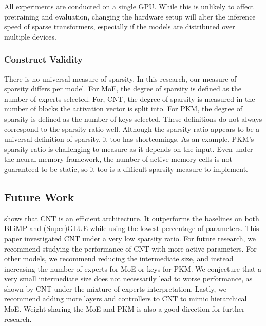 All experiments are conducted on a single GPU. While this is unlikely to affect pretraining and evaluation, changing the hardware setup will alter the inference speed of sparse transformers, especially if the models are distributed over multiple devices.
\subsubsection{Construct Validity}
There is no universal measure of sparsity. In this research, our measure of sparsity differs per model. For MoE, the degree of sparsity is defined as the number of experts selected. For, CNT, the degree of sparsity is measured in the number of blocks the activation vector is split into. For PKM, the degree of sparsity is defined as the number of keys selected. These definitions do not always correspond to the sparsity ratio well. Although the sparsity ratio appears to be a universal definition of sparsity, it too has shortcomings. As an example, PKM's sparsity ratio is challenging to measure as it depends on the input. Even under the neural memory framework, the number of active memory cells is not guaranteed to be static, so it too is a difficult sparsity measure to implement.

\subsection{Future Work}
 shows that CNT is an efficient architecture. It outperforms the baselines on both BLiMP and (Super)GLUE while using the lowest percentage of parameters. This paper investigated CNT under a very low sparsity ratio. For future research, we recommend studying the performance of CNT with more active parameters. For other models, we recommend reducing the intermediate size, and instead increasing the number of experts for MoE or keys for PKM. We conjecture that a very small intermediate size does not necessarily lead to worse performance, as shown by CNT under the mixture of experts interpretation. Lastly, we recommend adding more layers and controllers to CNT to mimic hierarchical MoE. Weight sharing the MoE and PKM is also a good direction for further research.